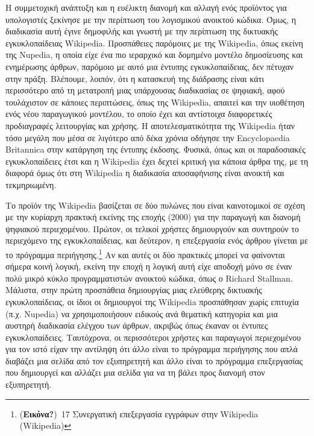 \documentclass[
]{article}
\begin{document}
Η συμμετοχική ανάπτυξη και η ευέλικτη διανομή και αλλαγή ενός προϊόντος
για υπολογιστές ξεκίνησε με την περίπτωση του λογισμικού ανοικτού
κώδικα. Όμως, η διαδικασία αυτή έγινε δημοφιλής και γνωστή με την
περίπτωση της δικτυακής εγκυκλοπαίδειας Wikipedia. Προσπάθειες παρόμοιες
με της Wikipedia, όπως εκείνη της Nupedia, η οποία είχε ένα πιο
ιεραρχικό και δομημένο μοντέλο δημοσίευσης και ενημέρωσης άρθρων,
παρόμοιο με αυτό μια έντυπης εγκυκλοπαίδειας, δεν πέτυχαν στην πράξη.
Βλέπουμε, λοιπόν, ότι η κατασκευή της διάδρασης είναι κάτι περισσότερο
από τη μετατροπή μιας υπάρχουσας διαδικασίας σε ψηφιακή, αφού
τουλάχιστον σε κάποιες περιπτώσεις, όπως της Wikipedia, απαιτεί και την
υιοθέτηση ενός νέου παραγωγικού μοντέλου, το οποίο έχει και αντίστοιχα
διαφορετικές προδιαγραφές λειτουργίας και χρήσης. Η αποτελεσματικότητα
της Wikipedia ήταν τόσο μεγάλη που μέσα σε λιγότερο από δέκα χρόνια
οδήγησε την Encyclopaedia Britannica στην κατάργηση της έντυπης έκδοσης.
Φυσικά, όπως και οι παραδοσιακές εγκυκλοπαίδειες έτσι και η Wikipedia
έχει δεχτεί κριτική για κάποια άρθρα της, με τη διαφορά όμως ότι στη
Wikipedia η διαδικασία αποσαφήνισης είναι ανοικτή και τεκμηριωμένη.

Το προϊόν της Wikipedia βασίζεται σε δύο πυλώνες που είναι καινοτομικοί
σε σχέση με την κυρίαρχη πρακτική εκείνης της εποχής (2000) για την
παραγωγή και διανομή ψηφιακού περιεχομένου. Πρώτον, οι τελικοί χρήστες
δημιουργούν και συντηρούν το περιεχόμενο της εγκυκλοπαίδειας, και
δεύτερον, η επεξεργασία ενός άρθρου γίνεται με το πρόγραμμα
περιήγησης.\footnote{(\textbf{Εικόνα?})~17 Συνεργατική επεξεργασία
  εγγράφων στην Wikipedia (Wikipedia)} Αν και αυτές οι δύο πρακτικές
μπορεί να φαίνονται σήμερα κοινή λογική, εκείνη την εποχή η λογική αυτή
είχε αποδοχή μόνο σε έναν πολύ μικρό κύκλο προγραμματιστών ανοικτού
κώδικα, όπως ο Richard Stallman. Μάλιστα, στην πρώτη προσπάθεια
δημιουργίας μιας ελεύθερης δικτυακής εγκυκλοπαίδειας, οι ίδιοι οι
δημιουργοί της Wikipedia προσπάθησαν χωρίς επιτυχία (π.χ. Nupedia) να
χρησιμοποιήσουν ειδικούς ανά θεματική κατηγορία και μια αυστηρή
διαδικασία ελέγχου των άρθρων, ακριβώς όπως έκαναν οι έντυπες
εγκυκλοπαίδειες. Ταυτόχρονα, οι περισσότεροι χρήστες και παραγωγοί
περιεχομένου για τον ιστό είχαν την αντίληψη ότι άλλο είναι το πρόγραμμα
περιήγησης που απλά διαβάζει μια σελίδα από τον εξυπηρετητή και άλλο
είναι το πρόγραμμα επεξεργασίας που δημιουργεί και αλλάζει μια σελίδα
για να τη βάλει προς διανομή στον εξυπηρετητή.
\end{document}
